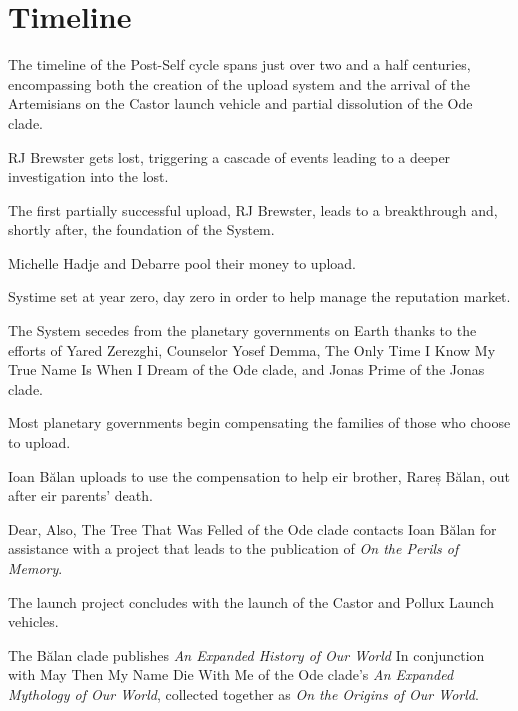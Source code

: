 \section*{Timeline}

The timeline of the Post-Self cycle spans just over two and a half centuries, encompassing both the creation of the upload system and the arrival of the Artemisians on the Castor launch vehicle and partial dissolution of the Ode clade.

\begin{description}
\tightlist
\item[\emph{2112 --- December 7}]
RJ Brewster gets lost, triggering a cascade of events leading to a deeper investigation into the lost.
\item[\emph{2115 --- February ??}]
The first partially successful upload, RJ Brewster, leads to a breakthrough and, shortly after, the foundation of the System.
\item[\emph{2117 --- ???}]
Michelle Hadje and Debarre pool their money to upload.
\item[\emph{2124 --- January 1}]
Systime set at year zero, day zero in order to help manage the reputation market.
\item[\emph{2125 --- January 21}]
The System secedes from the planetary governments on Earth thanks to the efforts of Yared Zerezghi, Counselor Yosef Demma, The Only Time I Know My True Name Is When I Dream of the Ode clade, and Jonas Prime of the Jonas clade.
\item[\emph{2170 --- Throughout the year}]
Most planetary governments begin compensating the families of those who choose to upload.
\item[\emph{2238 --- July 28}]
Ioan Bălan uploads to use the compensation to help eir brother, Rareș Bălan, out after eir parents' death.
\item[\emph{2305 --- November 8}]
Dear, Also, The Tree That Was Felled of the Ode clade contacts Ioan Bălan for assistance with a project that leads to the publication of \emph{On the Perils of Memory}.
\item[\emph{2325 --- January 21}]
The launch project concludes with the launch of the Castor and Pollux Launch vehicles.
\item[\emph{2326 --- October 30}]
The Bălan clade publishes \emph{An Expanded History of Our World} In conjunction with May Then My Name Die With Me of the Ode clade's \emph{An Expanded Mythology of Our World}, collected together as \emph{On the Origins of Our World}.

\end{description}
